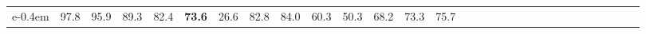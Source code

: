 \begin{table*}[]
\begin{tabular}{cc|cccccccccccccccccccccccccccc}
e{-0.4em} & \hspace{-0.9em}97.8\hspace{-0.4em} & \hspace{-0.9em}95.9\hspace{-0.4em} & \hspace{-0.9em}89.3\hspace{-0.4em} & \hspace{-0.9em}82.4\hspace{-0.4em} & \hspace{-0.9em}\textbf{73.6}\hspace{-0.4em} & \hspace{-0.9em}26.6\hspace{-0.4em} & \hspace{-0.9em}82.8\hspace{-0.4em} & \hspace{-0.9em}84.0\hspace{-0.4em} & \hspace{-0.9em}60.3\hspace{-0.4em} & \hspace{-0.9em}50.3\hspace{-0.4em} & \hspace{-0.9em}68.2\hspace{-0.4em} & \hspace{-0.9em}73.3\hspace{-0.4em} & \hspace{-0.9em}75.7\hspace{-0.4em} 
        \\

\end{tabular}
\end{table*}

